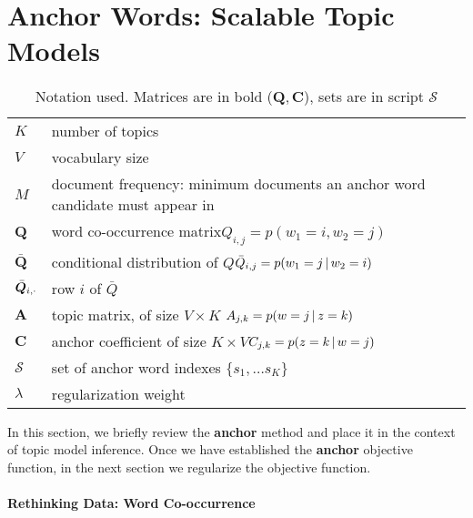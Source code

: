 \section{Anchor Words: Scalable Topic Models}

\label{sec:anchor}
\begin{table}[t!]
\begin{center}

\begin{small}
\begin{tabular}{|l p{6.25cm}| }
\hline
$K$ & number of topics\\
$V$ & vocabulary size\\
$M$ & document frequency: minimum documents an anchor word
candidate must appear in \\
$\bm{Q}$ & word co-occurrence matrix\newline  $Q_{i,j} = p(w_1 = i, w_2 = j) $\\
$\bm{\bar{ Q}}$ & conditional distribution of $Q$\newline  ${\bar Q}_{i,j} = p(w_1 = j \, | \, w_2= i)$ \\
$ \bar{\bm{Q}}_{i, \cdot} $ & row $i$ of ${\bar Q}$ \\
$\bm{A}$ & topic matrix, of size $V \times K$ \newline  $A_{j,k} = p(w=j \, | \, z=k)$ \\
$\bm{C}$ & anchor coefficient of size $K \times V$\newline $C_{j,k} = p(z=k\, | \,
w=j)$ \\
$\mathcal{S}$ & set of anchor word indexes $\{s_1, \dots s_K\}$ \\
$\lambda$ &regularization weight\\
\hline
\end{tabular}
\end{small}
\end{center}
\caption{Notation used.  Matrices are in bold ($\bm{Q}, \bm{C}$), sets are in
  script $\mathcal{S}$}
\label{tab:TableOfNotation}
\end{table}

In this section, we briefly review the {\bf anchor} method and place it in the
context of topic model inference.  Once we have established the {\bf anchor}
objective function, in the next section we regularize the objective function.

\paragraph{Rethinking Data: Word Co-occurrence}

